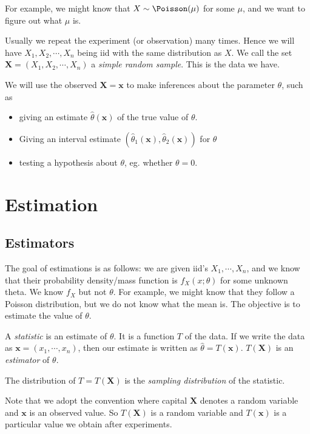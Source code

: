 \documentclass[a4paper]{article}
\begin{document}
For example, we might know that $X\sim \Poisson (\mu)$ for some $\mu$, and we want to figure out what $\mu$ is.

Usually we repeat the experiment (or observation) many times. Hence we will have $X_1, X_2, \cdots, X_n$ being iid with the same distribution as $X$. We call the set $\mathbf{X} = (X_1, X_2, \cdots, X_n)$ a \emph{simple random sample}. This is the data we have.

We will use the observed $\mathbf{X} = \mathbf{x}$ to make inferences about the parameter $\theta$, such as
\begin{itemize}
  \item giving an estimate $\hat{\theta}(\mathbf{x})$ of the true value of $\theta$.
  \item Giving an interval estimate $(\hat{\theta}_1(\mathbf{x}), \hat{\theta}_2(\mathbf{x}))$ for $\theta$
  \item testing a hypothesis about $\theta$, eg. whether $\theta = 0$.
\end{itemize}
\section{Estimation}
\subsection{Estimators}
The goal of estimations is as follows: we are given iid's $X_1, \cdots, X_n$, and we know that their probability density/mass function is $f_X(x; \theta)$ for some unknown theta. We know $f_X$ but not $\theta$. For example, we might know that they follow a Poisson distribution, but we do not know what the mean is. The objective is to estimate the value of $\theta$.

\begin{defi}[Statistic]
  A \emph{statistic} is an estimate of $\theta$. It is a function $T$ of the data. If we write the data as $\mathbf{x} = (x_1, \cdots, x_n)$, then our estimate is written as $\hat{\theta} = T(\mathbf{x})$. $T(\mathbf{X})$ is an \emph{estimator} of $\theta$.

  The distribution of $T = T(\mathbf{X})$ is the \emph{sampling distribution} of the statistic.
\end{defi}
Note that we adopt the convention where capital $\mathbf{X}$ denotes a random variable and $\mathbf{x}$ is an observed value. So $T(\mathbf{X})$ is a random variable and $T(\mathbf{x})$ is a particular value we obtain after experiments.
\end{document}
